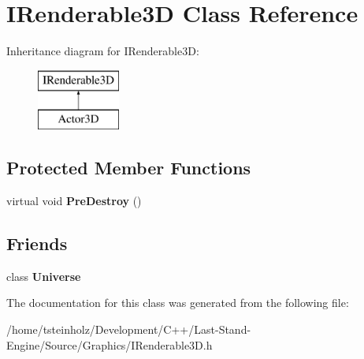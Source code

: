 \hypertarget{classIRenderable3D}{}\section{I\+Renderable3\+D Class Reference}
\label{classIRenderable3D}
Inheritance diagram for I\+Renderable3\+D\+:\begin{figure}[H]
\begin{center}
\leavevmode
\includegraphics[height=2.000000cm]{classIRenderable3D}
\end{center}
\end{figure}
\subsection*{Protected Member Functions}
\begin{DoxyCompactItemize}
\item 
\hypertarget{classIRenderable3D_acb5030f72e1b2eb8ae3d119fc89d75bb}{}virtual void {\bfseries Pre\+Destroy} ()\label{classIRenderable3D_acb5030f72e1b2eb8ae3d119fc89d75bb}

\end{DoxyCompactItemize}
\subsection*{Friends}
\begin{DoxyCompactItemize}
\item 
\hypertarget{classIRenderable3D_ac4da8dd404a2eaf5a0bd84aeb8de1197}{}class {\bfseries Universe}\label{classIRenderable3D_ac4da8dd404a2eaf5a0bd84aeb8de1197}

\end{DoxyCompactItemize}


The documentation for this class was generated from the following file\+:\begin{DoxyCompactItemize}
\item 
/home/tsteinholz/\+Development/\+C++/\+Last-\/\+Stand-\/\+Engine/\+Source/\+Graphics/I\+Renderable3\+D.\+h\end{DoxyCompactItemize}
